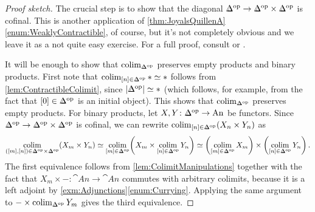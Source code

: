 \begin{proof}[Proof sketch]
	The crucial step is to show that the diagonal $\IDelta^\op\rightarrow \IDelta^\op\times\IDelta^\op$ is cofinal. This is another application of \cref{thm:JoyalsQuillenA}\cref{enum:WeaklyContractible}, of course, but it's not completely obvious and we leave it as a not quite easy exercise. For a full proof, consult \cite[Tag~\href{https://kerodon.net/tag/02QP}{02QP}]{Kerodon} or \cite[Exercise~\href{https://florianadler.github.io/AlgebraBonn/KTheory.pdf\#smallerdummy.2.18.1}{II.18$a$}]{KTheory}.
	
	It will be enough to show that $\colimit_{\IDelta^\op}$ preserves empty products and binary products. First note that $\colimit_{[n]\in \IDelta^\op}*\simeq *$ follows from \cref{lem:ContractibleColimit}, since  $\left|\IDelta^\op\right|\simeq *$ (which follows, for example, from the fact that $[0]\in\IDelta^\op$ is an initial object). This shows that $\colimit_{\IDelta^\op}$ preserves empty products. For binary products, let $X,Y\colon \IDelta^\op\rightarrow\cat{An}$ be functors. Since $\IDelta^\op\rightarrow\IDelta^\op\times\IDelta^\op$ is cofinal, we can rewrite $\colimit_{[n]\in\IDelta^\op}\left(X_n\times Y_n\right)$ as
	\begin{equation*}
		\colimit_{([m],[n])\in \IDelta^\op\times \IDelta^\op}\left(X_m\times Y_n\right)\simeq \colimit_{[m]\in\IDelta^\op}\biggl(X_m\times \colimit_{[n]\in\IDelta^\op}Y_n\biggr)
		\simeq \biggl(\colimit_{[m]\in\IDelta^\op}X_m\biggr)\times \biggl(\colimit_{[n]\in\IDelta^\op}Y_n\biggr)\,.
	\end{equation*}
	The first equivalence follows from \cref{lem:ColimitManipulations} together with the fact that $X_m\times -\colon \cat{An}\rightarrow\cat{An}$ commutes with arbitrary colimits, because it is a left adjoint by \cref{exm:Adjunctions}\cref{enum:Currying}. Applying the same argument to $-\times \colimit_{\IDelta^\op}Y_m$ gives the third equivalence.
\end{proof}
